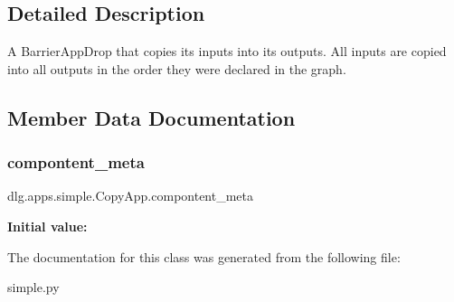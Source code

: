 \subsection{Detailed Description}
\begin{DoxyVerb}A BarrierAppDrop that copies its inputs into its outputs.
All inputs are copied into all outputs in the order they were declared in
the graph.
\end{DoxyVerb}
 

\subsection{Member Data Documentation}
\mbox{\label{classdlg_1_1apps_1_1simple_1_1_copy_app_a9d755eb2214dac2c29bacb3946471d7b}} 
\subsubsection{\texorpdfstring{compontent\_meta}{compontent\_meta}}
{\footnotesize\ttfamily dlg.\+apps.\+simple.\+Copy\+App.\+compontent\+\_\+meta\hspace{0.3cm}{\ttfamily [static]}}

{\bfseries Initial value\+:}
\begin{DoxyCode}{0}

\end{DoxyCode}


The documentation for this class was generated from the following file\+:\begin{DoxyCompactItemize}
\item 
simple.\+py\end{DoxyCompactItemize}

